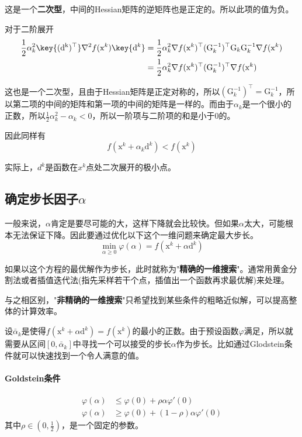 \documentclass[a4paper]{D:/repositories/MyDGP/latex/PaperReadingLog}
\begin{document}
这是一个\textbf{二次型}，中间的Hessian矩阵的逆矩阵也是正定的。所以此项的值为负。

对于二阶展开
$$
\begin{aligned}
    \frac{1}{2}\alpha_k^2\key{(\mathrm{d^k})^\top}\nabla^2 f(\mathrm{x}^k)\key{\mathrm{d}^k}&=\frac{1}{2}\alpha_k^2\nabla f(\mathrm{x}^k)^\top (\mathrm{G}_k^{-1})^\top \mathrm{G}_k \mathrm{G}_k^{-1} \nabla f(\mathrm{x}^k)\\
    &=\frac{1}{2}\alpha_k^2\nabla f(\mathrm{x}^k)^\top (\mathrm{G}_k^{-1})^\top \nabla f(\mathrm{x}^k)
\end{aligned}
$$

这也是一个二次型，且由于Hessian矩阵是正定对称的，所以$(\mathrm{G}_k^{-1})^\top=\mathrm{G}_k^{-1}$，所以第二项的中间的矩阵和第一项的中间的矩阵是一样的。而由于$\alpha_k$是一个很小的正数，所以$\frac{1}{2}\alpha_k^2-\alpha_k<0$，所以一阶项与二阶项的和是小于0的。

因此同样有
$$
f(\mathrm{x}^k+\alpha_k\mathrm{d}^k)<f(\mathrm{x}^k)
$$

实际上，$d^k$是函数在$x^k$点处二次展开的极小点。

\subsection{确定步长因子$\alpha$}
一般来说，$\alpha$肯定是要尽可能的大，这样下降就会比较快。但如果$\alpha$太大，可能根本无法保证下降。因此要通过优化以下这个一维问题来确定最大步长。
$$
\min_{\alpha\ge 0}\varphi(\alpha)=f(\mathrm{x}^k+\alpha\mathrm{d}^k)
$$

如果以这个方程的最优解作为步长，此时就称为"\textbf{精确的一维搜索}"。通常用黄金分割法或者插值迭代法(指先采样若干个点，插值出一个函数再求最优解)来处理。

与之相区别，"\textbf{非精确的一维搜索}"只希望找到某些条件的粗略近似解，可以提高整体的计算效率。

设$\bar{\alpha}_k$是使得$f(\mathrm{x}^k+\alpha\mathrm{d}^k)=f(\mathrm{x}^k)$的最小的正数。由于预设函数$\varphi$满足，所以就需要从区间$[0,\bar{\alpha}_k]$中寻找一个可以接受的步长$\alpha$作为步长。比如通过Glodstein条件就可以快速找到一个令人满意的值。

\paragraph{Goldstein条件}
$$
\begin{aligned}
    \varphi(\alpha)&\le \varphi(0)+\rho\alpha\varphi'(0)\\
    \varphi(\alpha)&\ge \varphi(0)+(1-\rho)\alpha\varphi'(0)
\end{aligned}
$$
其中$\rho\in(0,\frac{1}{2})$，是一个固定的参数。
\end{document}
